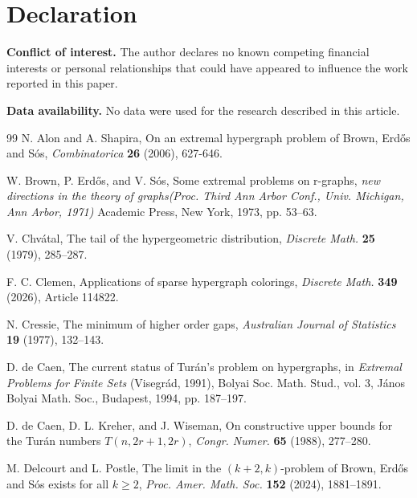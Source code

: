 \documentclass[12pt,a4paper]{article}
\numberwithin{equation}{section}
\theoremstyle{definition}
\theoremstyle{remark}
\begin{document}
\section*{Declaration}
\noindent\textbf{Conflict of interest.} The author declares no known competing financial interests
or personal relationships that could have appeared to influence the work reported in this paper.

\smallskip
\noindent\textbf{Data availability.} No data were used for the research described in this article.

\begin{thebibliography}{99}
\small
\setlength{\itemsep}{1pt}
N. Alon and A. Shapira, On an extremal hypergraph problem of Brown, Erdős and Sós,
\emph{Combinatorica} \textbf{26} (2006), 627-646.

W. Brown, P. Erd\H{o}s, and V. S\'os, Some extremal problems on r-graphs, 
\emph{new directions in the theory of graphs(Proc. Third Ann Arbor Conf., Univ. Michigan, Ann Arbor, 1971)}  Academic Press, New York, 1973, pp. 53–63.

V. Chv\'atal,
The tail of the hypergeometric distribution,
\emph{Discrete Math.} \textbf{25} (1979), 285--287.


F. C. Clemen,
Applications of sparse hypergraph colorings,
\emph{Discrete Math.} \textbf{349} (2026), Article 114822.

N. Cressie,
The minimum of higher order gaps,
\emph{Australian Journal of Statistics} \textbf{19} (1977), 132--143.

D. de Caen,
The current status of Tur\'an's problem on hypergraphs,
in {\em Extremal Problems for Finite Sets} (Visegr\'ad, 1991),
Bolyai Soc. Math. Stud., vol. 3, J\'anos Bolyai Math. Soc., Budapest, 1994, pp. 187--197.

D. de Caen, D. L. Kreher, and J. Wiseman,
On constructive upper bounds for the Tur\'an numbers $T(n,2r+1,2r)$,
\emph{Congr. Numer.} \textbf{65} (1988), 277--280.

M. Delcourt and L. Postle, The limit in the $(k+2, k)$-problem of Brown, Erdős and Sós exists for all $k \ge  2$,
\emph{Proc. Amer. Math. Soc.} \textbf{152} (2024), 1881--1891. 




\end{thebibliography}
\end{document}
